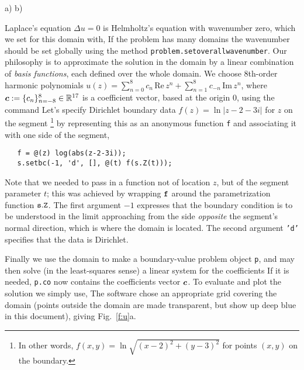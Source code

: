 \bfi %
a)
b)
\efi

Laplace's equation $\Delta u = 0$ is Helmholtz's equation with wavenumber
zero, which we set for this domain with,
If the problem has many domains the wavenumber should be set globally using the
method {\texttt{problem.setoverallwavenumber}}.
Our philosophy is
to approximate the solution in the domain by a linear combination of
{\em basis functions}, each defined over the whole domain.
We choose 8th-order harmonic polynomials
$u(z) = \sum_{n=0}^{8} c_n \,\mbox{Re}\,z^n +
\sum_{n=1}^{8} c_{-n}\,\mbox{Im}\,z^n$, where ${\bm c}:=\{c_n\}_{n=-8}^{8}
\in\mathbb{R}^{17}$
is a coefficient vector, based at the origin 0,
using the command
Let's specify Dirichlet boundary data $f(z) = 
\ln |z-2-3i|$ for
$z$ on the segment%
  \footnote{In other words, $f(x,y) = \ln \sqrt{(x-2)^2+(y-3)^2}$
    for points $(x,y)$ on the boundary.}
by representing this as an anonymous function {\tt f}
and associating it with one side of the segment,
\begin{verbatim}
   f = @(z) log(abs(z-2-3i));
   s.setbc(-1, 'd', [], @(t) f(s.Z(t)));
\end{verbatim}
Note that we needed to pass in a function not of location $z$,
but of the segment parameter $t$;
this was achieved by
wrapping ${\tt f}$ around the parametrization function ${\tt s.Z}$.
The first argument $-1$ expresses that the boundary condition is to be
understood in the limit approaching from the side {\em opposite} the
segment's normal direction, which is where the domain is located.
The second argument {\tt 'd'} specifies that the data is Dirichlet.
 
Finally we use the domain to make a boundary-value
problem object {\tt p},
and may then solve (in the least-squares sense)
a linear system for the coefficients
If it is needed, {\tt p.co} now contains the coefficients vector ${\bm c}$.
To evaluate and plot the solution we simply use,
The software chose an appropriate grid covering the domain
(points outside the domain are made transparent, but show
up deep blue in this document), giving Fig.~\ref{f:u}a.


